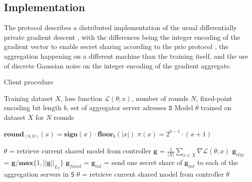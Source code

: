 \documentclass{article}
\begin{document}
\subsection{Implementation}
 The protocol describes a distributed implementation of the usual differentially private gradient descent \cite{Abadi_2016}, with the differences being the integer encoding of the gradient vector to enable secret sharing according to the prio protocol \cite{prio}, the aggregation happening on a different machine than the training itself, and the use of discrete Gaussian noise on the integer encoding of the gradient aggregate.
\begin{algorithm}[h]
  \caption{Client procedure}\label{alg:client}

  \begin{algorithmic}[1]
  \Require Training dataset $X$, loss function $\mathcal L(\theta; x)$, number of rounds $N$, fixed-point encoding bit length $b$, set of aggregator server adresses $\texttt{S}$
  \Ensure Model $\theta$ trained on dataset $X$ for $N$ rounds

  \State $\textbf{round}_{(b,0)}(x) = \textbf{sign}(x) \cdot \textbf{floor}_b(|x|)$ 
  \State $\pi(x) = 2^{b-1}\cdot (x + 1)$ 

  \label{lst:line:loop}
  \State$\theta$ = retrieve current shared model from controller\label{lst:line:retrieve}
  \State$\textbf{g}$ = $\frac{1}{|X|} \sum_{x\in X} \nabla\mathcal L(\theta; x)$ 
\label{lst:line:grad}
  \State$\textbf{g}_{clip}$ = $\textbf{g}/\mathbf{max}\{1,||\textbf{g}||_{L_2}\}$ \label{lst:line:clip}
  \State$\textbf{g}_{fixed}$ =  
  \State$\textbf{g}_{int}$ =  
\label{lst:line:project}
  \State send one secret share of $\textbf{g}_{int}$ to each of the aggregation servers in \texttt S
  \EndFor
  \State$\theta$ = retrieve current shared model from controller
  \State\Return $\theta$
  \end{algorithmic}
\end{algorithm}
\end{document}

